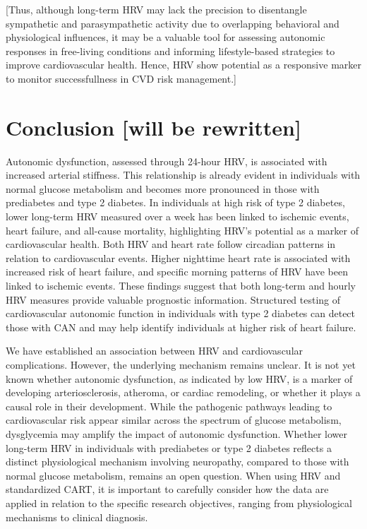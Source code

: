 \documentclass[
  a4paper,
  headsepline=true,
  open=any]{scrbook}
\begin{document}
{[}Thus, although long-term HRV may lack the precision to disentangle
sympathetic and parasympathetic activity due to overlapping behavioral
and physiological influences, it may be a valuable tool for assessing
autonomic responses in free-living conditions and informing
lifestyle-based strategies to improve cardiovascular health. Hence, HRV
show potential as a responsive marker to monitor successfullness in CVD
risk management.{]}


\hypertarget{conclusion-will-be-rewritten}{%
\chapter{Conclusion {[}will be
rewritten{]}}\label{conclusion-will-be-rewritten}}

Autonomic dysfunction, assessed through 24-hour HRV, is associated with
increased arterial stiffness. This relationship is already evident in
individuals with normal glucose metabolism and becomes more pronounced
in those with prediabetes and type 2 diabetes. In individuals at high
risk of type 2 diabetes, lower long-term HRV measured over a week has
been linked to ischemic events, heart failure, and all-cause mortality,
highlighting HRV's potential as a marker of cardiovascular health. Both
HRV and heart rate follow circadian patterns in relation to
cardiovascular events. Higher nighttime heart rate is associated with
increased risk of heart failure, and specific morning patterns of HRV
have been linked to ischemic events. These findings suggest that both
long-term and hourly HRV measures provide valuable prognostic
information. Structured testing of cardiovascular autonomic function in
individuals with type 2 diabetes can detect those with CAN and may help
identify individuals at higher risk of heart failure.

We have established an association between HRV and cardiovascular
complications. However, the underlying mechanism remains unclear. It is
not yet known whether autonomic dysfunction, as indicated by low HRV, is
a marker of developing arteriosclerosis, atheroma, or cardiac
remodeling, or whether it plays a causal role in their development.
While the pathogenic pathways leading to cardiovascular risk appear
similar across the spectrum of glucose metabolism, dysglycemia may
amplify the impact of autonomic dysfunction. Whether lower long-term HRV
in individuals with prediabetes or type 2 diabetes reflects a distinct
physiological mechanism involving neuropathy, compared to those with
normal glucose metabolism, remains an open question. When using HRV and
standardized CART, it is important to carefully consider how the data
are applied in relation to the specific research objectives, ranging
from physiological mechanisms to clinical diagnosis.
\end{document}
